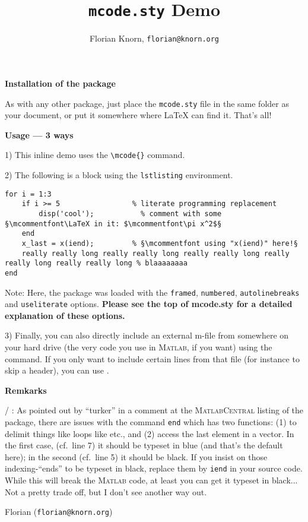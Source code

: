 \documentclass{article}
\title{\texttt{mcode.sty} Demo}
\author{Florian Knorn, \texttt{florian@knorn.org}}
\begin{document}
\maketitle

\textbf{Installation of the package}

As with any other package, just place the \verb|mcode.sty| file in the same folder as your document, or put it somewhere where \LaTeX{} can find it.  That's all!

\medskip

\textbf{Usage --- 3 ways}

1) This inline demo  uses the \verb|\mcode{}| command.

2) The following is a block using the \verb|lstlisting| environment.
\begin{lstlisting}
for i = 1:3
	if i >= 5                 % literate programming replacement
		disp('cool');           % comment with some §\mcommentfont\LaTeX in it: $\mcommentfont\pi x^2$§
	end
	x_last = x(iend);         % §\mcommentfont using "x(iend)" here!§
	really really long really really long really really long really really long really really long % blaaaaaaaa
end
\end{lstlisting}
Note: Here, the package was loaded with the \verb|framed|, \verb|numbered|, \verb|autolinebreaks| and \verb|useliterate| options.  \textbf{Please see the top of mcode.sty for a detailed explanation of these options.}


3) Finally, you can also directly include an external m-file from somewhere on your hard drive (the very code you use in \textsc{Matlab}, if you want) using the \verb|| command.  If you only want to include certain lines from that file (for instance to skip a header), you can use \verb||.

\medskip

\textbf{Remkarks}

 / : As pointed out by ``turker'' in a comment at the \textsc{MatlabCentral} listing of the package, there are issues with the command \texttt{end} which has two functions: (1) to delimit things like loops like  etc., and (2) access the last element in a vector.  In the first case, (cf.\ line 7) it should be typeset in blue (and that's the default here); in the second (cf.\ line 5) it should be black.   If you insist on those indexing-``ends'' to be typeset in black, replace them by \texttt{iend} in your source code.  While this will break the \textsc{Matlab} code, at least you can get it typeset in black... Not a pretty trade off, but I don't see another way out.


Florian (\texttt{florian@knorn.org})
\end{document}
